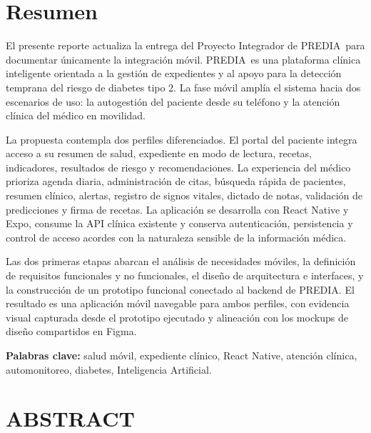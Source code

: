 \documentclass[12pt,letterpaper]{report}
\newcommand{\projectname}{PREDIA}
\begin{document}
\setcounter{page}{2}

\chapter*{Resumen}

El presente reporte actualiza la entrega del Proyecto Integrador de \projectname\ para documentar únicamente la integración móvil. \projectname\ es una plataforma clínica inteligente orientada a la gestión de expedientes y al apoyo para la detección temprana del riesgo de diabetes tipo 2. La fase móvil amplía el sistema hacia dos escenarios de uso: la autogestión del paciente desde su teléfono y la atención clínica del médico en movilidad.

La propuesta contempla dos perfiles diferenciados. El portal del paciente integra acceso a su resumen de salud, expediente en modo de lectura, recetas, indicadores, resultados de riesgo y recomendaciones. La experiencia del médico prioriza agenda diaria, administración de citas, búsqueda rápida de pacientes, resumen clínico, alertas, registro de signos vitales, dictado de notas, validación de predicciones y firma de recetas. La aplicación se desarrolla con React Native y Expo, consume la API clínica existente y conserva autenticación, persistencia y control de acceso acordes con la naturaleza sensible de la información médica.

Las dos primeras etapas abarcan el análisis de necesidades móviles, la definición de requisitos funcionales y no funcionales, el diseño de arquitectura e interfaces, y la construcción de un prototipo funcional conectado al backend de \projectname. El resultado es una aplicación móvil navegable para ambos perfiles, con evidencia visual capturada desde el prototipo ejecutado y alineación con los mockups de diseño compartidos en Figma.

\noindent\textbf{Palabras clave:} salud móvil, expediente clínico, React Native, atención clínica, automonitoreo, diabetes, Inteligencia Artificial.

\clearpage

\chapter*{ABSTRACT}
\end{document}
